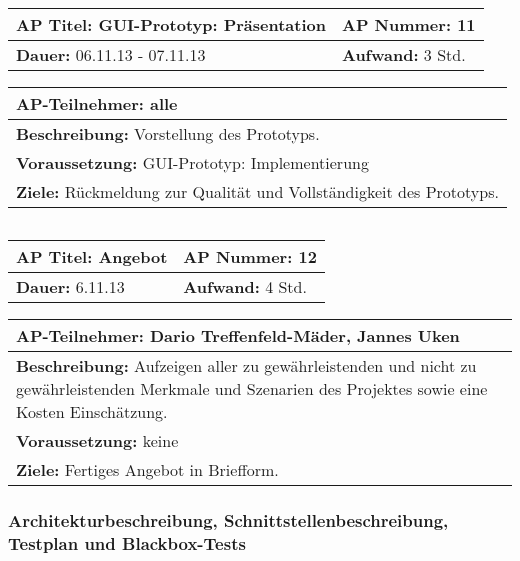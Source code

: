 \begin{verbatim}

\end{verbatim}
\begin{tabular}{|p{7.43cm}|p{7.43cm}|}
\hline
\textbf{AP Titel: }GUI-Prototyp: Präsentation & \textbf{AP Nummer: }11\\ 
\hline
\textbf{Dauer: }06.11.13 - 07.11.13 & \textbf{Aufwand: }3 Std.\\
\hline
\end{tabular}
\begin{tabular}{|p{15.3cm}|}
\hline
\textbf{AP-Teilnehmer: }alle\\
\hline
\textbf{Beschreibung: }Vorstellung des Prototyps.\\
\hline
\textbf{Voraussetzung: }GUI-Prototyp: Implementierung\\
\hline 
\textbf{Ziele: }Rückmeldung zur Qualität und Vollständigkeit des Prototyps.\\
\hline 
\end{tabular}
\begin{verbatim}

\end{verbatim}
\begin{tabular}{|p{7.43cm}|p{7.43cm}|}
\hline
\textbf{AP Titel: }Angebot & \textbf{AP Nummer: }12\\ 
\hline
\textbf{Dauer: }6.11.13 & \textbf{Aufwand: }4 Std.\\
\hline
\end{tabular}
\begin{tabular}{|p{15.3cm}|}
\hline
\textbf{AP-Teilnehmer: }Dario Treffenfeld-Mäder, Jannes Uken\\
\hline
\textbf{Beschreibung: }Aufzeigen aller zu gewährleistenden und nicht zu gewährleistenden Merkmale und Szenarien des Projektes sowie eine Kosten Einschätzung.\\
\hline
\textbf{Voraussetzung: }keine\\
\hline 
\textbf{Ziele: }Fertiges Angebot in Briefform.\\
\hline 
\end{tabular}


\subsubsection{Architekturbeschreibung, Schnittstellenbeschreibung, Testplan und Blackbox-Tests}

